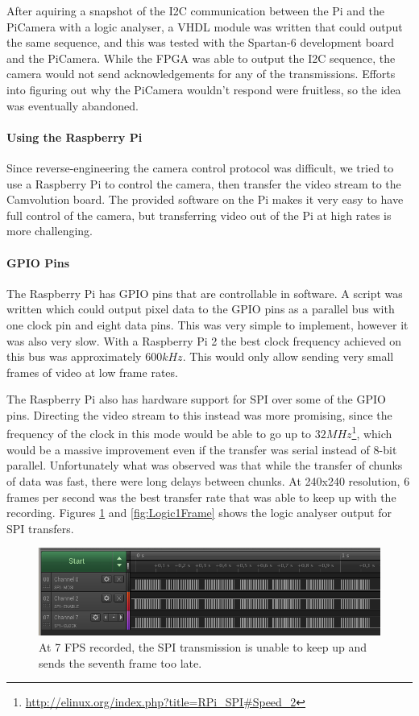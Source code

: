 After aquiring a snapshot of the I2C communication between the Pi and the PiCamera with a logic analyser,
a VHDL module was written that could output the same sequence,
and this was tested with the Spartan-6 development board and the PiCamera.
While the FPGA was able to output the I2C sequence,
the camera would not send acknowledgements for any of the transmissions.
Efforts into figuring out why the PiCamera wouldn't respond were fruitless, so the idea was eventually abandoned.

\paragraph{Using the Raspberry Pi}
Since reverse-engineering the camera control protocol was difficult,
we tried to use a Raspberry Pi to control the camera,
then transfer the video stream to the Camvolution board.
The provided software on the Pi makes it very easy to have full control of the camera,
but transferring video out of the Pi at high rates is more challenging.

\paragraph{GPIO Pins}
The Raspberry Pi has GPIO pins that are controllable in software.
A script was written which could output pixel data to the GPIO pins as a parallel bus with one clock pin and eight data pins.
This was very simple to implement, however it was also very slow.
With a Raspberry Pi 2 the best clock frequency achieved on this bus was approximately $600kHz$.
This would only allow sending very small frames of video at low frame rates.

The Raspberry Pi also has hardware support for SPI over some of the GPIO pins.
Directing the video stream to this instead was more promising,
since the frequency of the clock in this mode would be able to go up to $32MHz$\footnote{\url{http://elinux.org/index.php?title=RPi\_SPI\#Speed\_2}},
which would be a massive improvement even if the transfer was serial instead of 8-bit parallel.
Unfortunately what was observed was that while the transfer of chunks of data was fast,
there were long delays between chunks.
At 240x240 resolution, 6 frames per second was the best transfer rate that was able to keep up with the recording.
Figures \ref{fig:Logic7fps} and \ref{fig:Logic1Frame} shows the logic analyser output for SPI transfers.

\begin{figure}
    \centering
    \includegraphics[width=\linewidth]{img/logic/7fps}
    \caption[7 FPS SPI transmission]{
        At 7 FPS recorded, the SPI transmission is unable to keep up and sends the seventh frame too late.
    }
    \label{fig:Logic7fps}
\end{figure}

